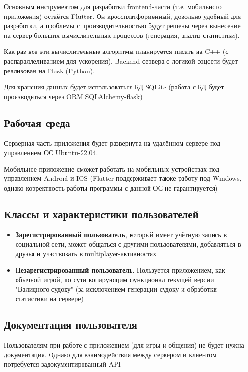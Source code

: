 \documentclass{article}
\begin{document}
Основным инструментом для разработки frontend-части (т.е. мобильного приложения) остаётся Flutter. Он кроссплатформенный, довольно удобный для разработки, а проблемы с производительностью будут решены через вынесение на сервер больших вычислительных процессов (генерация, анализ статистики).

Как раз все эти вычислительные алгоритмы планируется писать на C++ (с распараллеливанием для ускорения).
Backend сервера с логикой соцсети будет реализован на Flask (Python).

Для хранения данных будет использоваться БД SQLite (работа с БД будет производиться через ORM SQLAlchemy-flask)

\subsection*{Рабочая среда}

Серверная часть приложения будет развернута на удалённом сервере под управлением ОС Ubuntu-22.04.

Мобильное приложение сможет работать на мобильных устройствах под управлением Android и IOS (Flutter поддерживает также работу под Windows, однако корректность работы программы с данной ОС не гарантируется)

\subsection*{Классы и характеристики пользователей}
\begin{itemize}
    \item \textbf{Зарегистрированный пользователь}, который имеет учётную запись в социальной сети, может общаться с другими пользователями, добавляться в друзья и участвовать в multiplayer-активностях
    \item \textbf{Незарегистрированный пользователь}. Пользуется приложением, как обычной игрой, по сути копирующим функционал текущей версии "Валидного судоку" (за исключением генерации судоку и обработки статистики на сервере)
\end{itemize}

\subsection*{Документация пользователя}
Пользователям при работе с приложением (для игры и общения) не будет нужна документация. Однако для взаимодействия между сервером и клиентом потребуется задокументированный API
\end{document}
